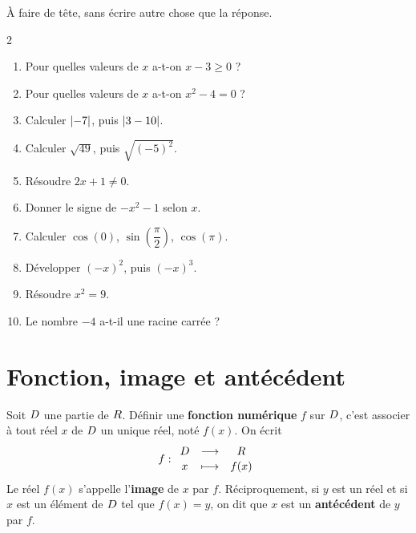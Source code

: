 \begin{automatismes}\label{t11s-c01-auto}
À faire de tête, sans écrire autre chose que la réponse.

\begin{multicols}{2}
\begin{enumerate}[label=\textbf{\arabic*.}, leftmargin=1.5em, itemsep=0.15em]
  \item Pour quelles valeurs de $x$ a-t-on $x - 3 \geq 0$ ?
  \item Pour quelles valeurs de $x$ a-t-on $x^{2} - 4 = 0$ ?
  \item Calculer $\left|-7\right|$, puis $\left|3 - 10\right|$.
  \item Calculer $\sqrt{49}$, puis $\sqrt{(-5)^{2}}$.
  \item Résoudre $2x + 1 \neq 0$.
  \item Donner le signe de $-x^{2} - 1$ selon $x$.
  \item Calculer $\cos(0)$, $\sin\!\left(\dfrac{\pi}{2}\right)$,
        $\cos(\pi)$.
  \item Développer $(-x)^{2}$, puis $(-x)^{3}$.
  \item Résoudre $x^{2} = 9$.
  \item Le nombre $-4$ a-t-il une racine carrée ?
\end{enumerate}
\end{multicols}
\end{automatismes}

\section{Fonction, image et antécédent}

\begin{definition}
Soit $D$ une partie de $R$. Définir une \textbf{fonction numérique} $f$ sur
$D$, c'est associer à tout réel $x$ de $D$ un unique réel, noté $f(x)$.
On écrit
\[
  f : \begin{array}{ccc}
        D & \longrightarrow & R \\[0.15em]
        x   & \longmapsto     & f(x)
      \end{array}
\]
Le réel $f(x)$ s'appelle l'\textbf{image} de $x$ par $f$. Réciproquement, si
$y$ est un réel et si $x$ est un élément de $D$ tel que $f(x) = y$, on dit
que $x$ est un \textbf{antécédent} de $y$ par $f$.
\end{definition}

